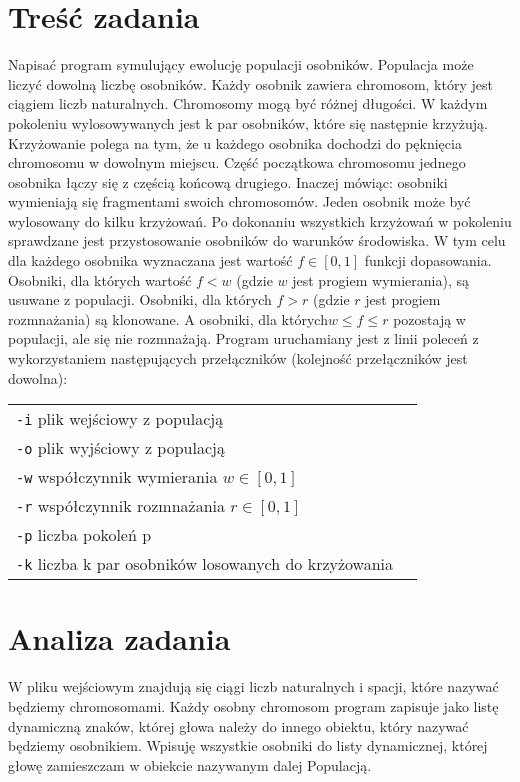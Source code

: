 \documentclass[12pt,a4paper]{article}
\begin{document}
\section{Treść zadania}
Napisać program symulujący ewolucję populacji osobników. Populacja może liczyć dowolną liczbę osobników.
Każdy osobnik zawiera chromosom, który jest ciągiem liczb naturalnych. Chromosomy mogą być
różnej długości. W każdym pokoleniu wylosowywanych jest k par osobników, które się następnie krzyżują.
Krzyżowanie polega na tym, że u każdego osobnika dochodzi do pęknięcia chromosomu w dowolnym
miejscu. Część początkowa chromosomu jednego osobnika łączy się z częścią końcową drugiego. Inaczej
mówiąc: osobniki wymieniają się fragmentami swoich chromosomów. Jeden osobnik może być wylosowany
do kilku krzyżowań. Po dokonaniu wszystkich krzyżowań w pokoleniu sprawdzane jest przystosowanie
osobników do warunków środowiska. W tym celu dla każdego osobnika wyznaczana jest wartość $f \in [0, 1]$
funkcji dopasowania. Osobniki, dla których wartość $f < w$ (gdzie $w$ jest progiem wymierania), są usuwane
z populacji. Osobniki, dla których $f > r$ (gdzie {$r$} jest progiem rozmnażania) są klonowane. A osobniki,
dla których$ w \leq f \leq r$ pozostają w populacji, ale się nie rozmnażają.
Program uruchamiany jest z linii poleceń z wykorzystaniem następujących przełączników (kolejność
przełączników jest dowolna):
\begin{tabular}{ll}
\texttt{-i} plik wejściowy z populacją\\
\texttt{-o} plik wyjściowy z populacją\\
\texttt{-w} współczynnik wymierania $w \in [0, 1]$\\
\texttt{-r} współczynnik rozmnażania $r \in [0, 1]$\\
\texttt{-p} liczba pokoleń p\\
\texttt{-k} liczba k par osobników losowanych do krzyżowania \\
\end{tabular}

\section{Analiza zadania}
W pliku wejściowym znajdują się ciągi liczb naturalnych i spacji, które nazywać będziemy chromosomami. Każdy osobny chromosom program zapisuje jako listę dynamiczną znaków, której głowa należy do innego obiektu, który nazywać będziemy osobnikiem. Wpisuję wszystkie osobniki do listy dynamicznej, której głowę zamieszczam w obiekcie nazywanym dalej Populacją.
\end{document}
